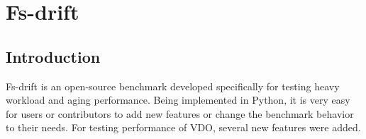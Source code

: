\documentclass[
  color, %
  table, %
  lof,   %
  lot,   %
]{fithesis3}
\begin{document}





\chapter{Fs-drift}
\label{benchmarks}

\section{Introduction}
Fs-drift is an open-source benchmark developed specifically for testing heavy workload and aging performance. Being implemented in Python, it is very easy for users or contributors to add new features or change the benchmark behavior to their needs. For testing performance of VDO, several new features were added.
\end{document}
